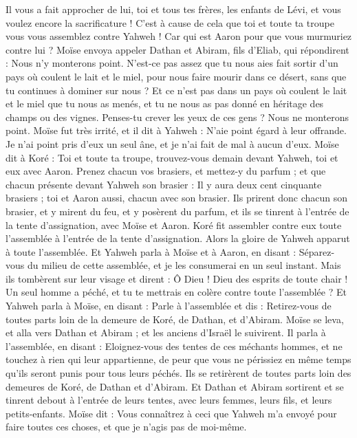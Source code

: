 \begin{multicols}{2}
Il vous a fait approcher de lui, toi et tous tes frères, les enfants de Lévi, et vous voulez encore la sacrificature !
C'est à cause de cela que toi et toute ta troupe vous vous assemblez contre Yahweh ! Car qui est Aaron pour que vous murmuriez contre lui ?
Moïse envoya appeler Dathan et Abiram, fils d'Eliab, qui répondirent : Nous n’y monterons point.
N’est-ce pas assez que tu nous aies fait sortir d'un pays où coulent le lait et le miel, pour nous faire mourir dans ce désert, sans que tu continues à dominer sur nous ?
Et ce n’est pas dans un pays où coulent le lait et le miel que tu nous as menés, et tu ne nous as pas donné en héritage des champs ou des vignes. Penses-tu crever les yeux de ces gens ? Nous ne monterons point.
Moïse fut très irrité, et il dit à Yahweh : N’aie point égard à leur offrande. Je n'ai point pris d'eux un seul âne, et je n'ai fait de mal à aucun d'eux.
Moïse dit à Koré : Toi et toute ta troupe, trouvez-vous demain devant Yahweh, toi et eux avec Aaron.
Prenez chacun vos brasiers, et mettez-y du parfum ; et que chacun présente devant Yahweh son brasier : Il y aura deux cent cinquante brasiers ; toi et Aaron aussi, chacun avec son brasier.
Ils prirent donc chacun son brasier, et y mirent du feu, et y posèrent du parfum, et ils se tinrent à l'entrée de la tente d'assignation, avec Moïse et Aaron.
Koré fit assembler contre eux toute l'assemblée à l'entrée de la tente d'assignation. Alors la gloire de Yahweh apparut à toute l'assemblée.
Et Yahweh parla à Moïse et à Aaron, en disant :
Séparez-vous du milieu de cette assemblée, et je les consumerai en un seul instant.
Mais ils tombèrent sur leur visage et dirent : Ô Dieu ! Dieu des esprits de toute chair ! Un seul homme a péché, et tu te mettrais en colère contre toute l'assemblée ?
Et Yahweh parla à Moïse, en disant :
Parle à l'assemblée et dis : Retirez-vous de toutes parts loin de la demeure de Koré, de Dathan, et d'Abiram.
Moïse se leva, et alla vers Dathan et Abiram ; et les anciens d'Israël le suivirent.
Il parla à l'assemblée, en disant : Eloignez-vous des tentes de ces méchants hommes, et ne touchez à rien qui leur appartienne, de peur que vous ne périssiez en même temps qu’ils seront punis pour tous leurs péchés.
Ils se retirèrent de toutes parts loin des demeures de Koré, de Dathan et d'Abiram. Et Dathan et Abiram sortirent et se tinrent debout à l'entrée de leurs tentes, avec leurs femmes, leurs fils, et leurs petits-enfants.
Moïse dit : Vous connaîtrez à ceci que Yahweh m'a envoyé pour faire toutes ces choses, et que je n’agis pas de moi-même.

\end{multicols}
